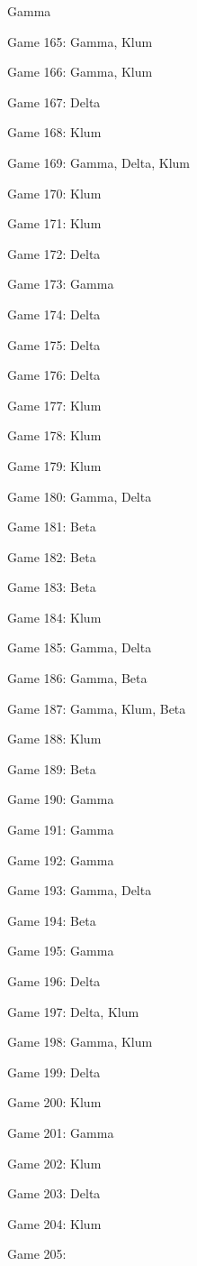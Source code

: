 \documentclass{article}
\begin{document}
\begin{multicols}{3}
\begin{compactitem}
Gamma
\item Game 165:
Gamma, Klum
\item Game 166:
Gamma, Klum
\item Game 167:
Delta
\item Game 168:
Klum
\item Game 169:
Gamma, Delta, Klum
\item Game 170:
Klum
\item Game 171:
Klum
\item Game 172:
Delta
\item Game 173:
Gamma
\item Game 174:
Delta
\item Game 175:
Delta
\item Game 176:
Delta
\item Game 177:
Klum
\item Game 178:
Klum
\item Game 179:
Klum
\item Game 180:
Gamma, Delta
\item Game 181:
Beta
\item Game 182:
Beta
\item Game 183:
Beta
\item Game 184:
Klum
\item Game 185:
Gamma, Delta
\item Game 186:
Gamma, Beta
\item Game 187:
Gamma, Klum, Beta
\item Game 188:
Klum
\item Game 189:
Beta
\item Game 190:
Gamma
\item Game 191:
Gamma
\item Game 192:
Gamma
\item Game 193:
Gamma, Delta
\item Game 194:
Beta
\item Game 195:
Gamma
\item Game 196:
Delta
\item Game 197:
Delta, Klum
\item Game 198:
Gamma, Klum
\item Game 199:
Delta
\item Game 200:
Klum
\item Game 201:
Gamma
\item Game 202:
Klum
\item Game 203:
Delta
\item Game 204:
Klum
\item Game 205:

\end{compactitem}
\end{multicols}
\end{document}
